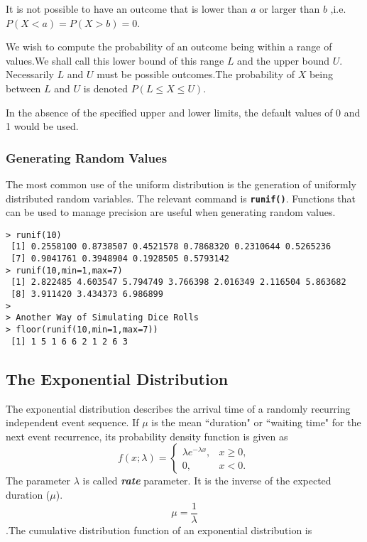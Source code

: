 \documentclass[a4paper,12pt]{article}
\begin{document}
It is not possible to have an outcome that is lower than $a$ or larger than $b$ ,i.e. $ P(X < a) = P(X > b) = 0$.

We wish to compute the probability of an outcome being within a range of values.We shall call this lower bound of this range $L$ and the upper bound $ U$. Necessarily $L$ and $U$ must be possible outcomes.The probability of $X$ being between $L$ and $U$ is denoted $P( L \leq X \leq U )$.

In the absence of the specified upper and lower limits, the default values of 0 and 1 would be used.

\subsubsection{Generating Random Values}
The most common use of the uniform distribution is the generation of uniformly distributed random variables. The relevant command is \texttt{\textbf{runif()}}. Functions that can be used to manage precision are useful when generating random values.

\begin{verbatim}
> runif(10)
 [1] 0.2558100 0.8738507 0.4521578 0.7868320 0.2310644 0.5265236
 [7] 0.9041761 0.3948904 0.1928505 0.5793142
> runif(10,min=1,max=7)
 [1] 2.822485 4.603547 5.794749 3.766398 2.016349 2.116504 5.863682
 [8] 3.911420 3.434373 6.986899
>
> Another Way of Simulating Dice Rolls
> floor(runif(10,min=1,max=7))
 [1] 1 5 1 6 6 2 1 2 6 3
\end{verbatim}


\subsection{The Exponential Distribution}

The exponential distribution describes the arrival time of a randomly recurring independent event sequence. If $\mu$ is the mean ``duration" or ``waiting time" for the next event recurrence, its probability density function is given as
\[
f(x;\lambda) = \begin{cases}
\lambda e^{-\lambda x}, & x \ge 0, \\
0, & x < 0.
\end{cases}\]
The parameter $\lambda$  is called \textbf{\emph{rate}} parameter. It is the inverse of the expected duration ($\mu$).\\
\[\mu= \frac{1}{\lambda}\].The cumulative distribution function of an exponential distribution is
\end{document}
